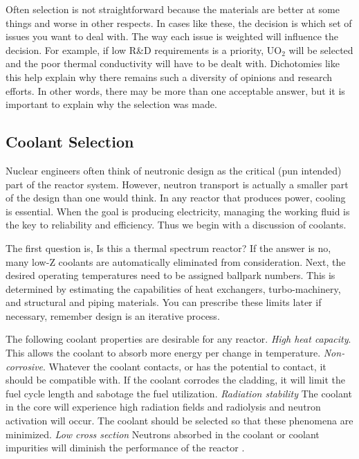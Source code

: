 Often selection is not straightforward because the materials are better at some things and worse in other respects. In cases like these, the decision is which set of issues you want to deal with.
The way each issue is weighted will influence the decision. For example, if low R\&D requirements is a priority, UO$_2$ will be selected and the poor thermal conductivity will have to be dealt with. 
Dichotomies like this help explain why there remains such a diversity of opinions and research efforts.
In other words, there may be more than one acceptable answer, but it is important to explain why the selection was made.


\subsection{Coolant Selection}
Nuclear engineers often think of neutronic design as the critical (pun intended) part of the reactor system. However, neutron transport is actually a smaller part of the design than one would think.
In any reactor that produces power, cooling is essential. When the goal is producing electricity, managing the working fluid is the key to reliability and efficiency. Thus we begin with a discussion of coolants.

The first question is, Is this a thermal spectrum reactor? If the answer is no, many low-Z coolants are automatically eliminated from consideration.
Next, the desired operating temperatures need to be assigned ballpark numbers. This is determined by estimating the capabilities of heat exchangers, turbo-machinery, and structural and piping materials. You can prescribe these limits later if necessary, remember design is an iterative process. 

The following coolant properties are desirable for any reactor. \emph{High heat capacity}. This allows the coolant to absorb more energy per change in temperature. \emph{Non-corrosive}. Whatever the coolant contacts, or has the potential to contact, it should be compatible with. If the coolant corrodes the cladding, it will limit the fuel cycle length and sabotage the fuel utilization. \emph{Radiation stability} The coolant in the core will experience high radiation fields and radiolysis and neutron activation will occur. The coolant should be selected so that these phenomena are minimized. \emph{Low cross section} Neutrons absorbed in the coolant or coolant impurities will diminish the performance of the reactor \cite{Hausner}.

